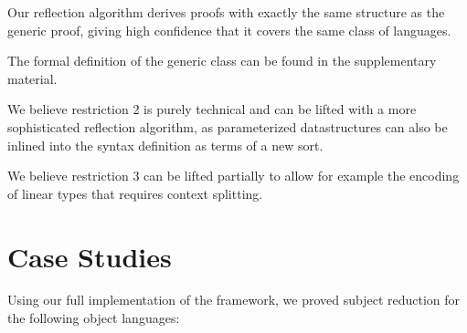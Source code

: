 \documentclass[a4paper, UKenglish, cleveref, autoref, thm-restate]{lipics-v2021}
\begin{document}
  Our reflection algorithm derives proofs with exactly the same
  structure as the generic proof, giving high confidence that it covers
  the same class of languages.

  The formal definition of the generic class can be found in
  the supplementary material.

  We believe restriction 2 is purely technical and can be lifted
  with a more sophisticated reflection algorithm, as parameterized
  datastructures can also be inlined into the syntax definition as terms
  of a new sort.

  We believe restriction 3 can be lifted partially to allow for
  example the encoding of linear types that requires context
  splitting.


  \section{Case Studies}
  \label{sec:casestudies}
  Using our full implementation of the framework, we proved subject
  reduction for the following object languages:
\end{document}
